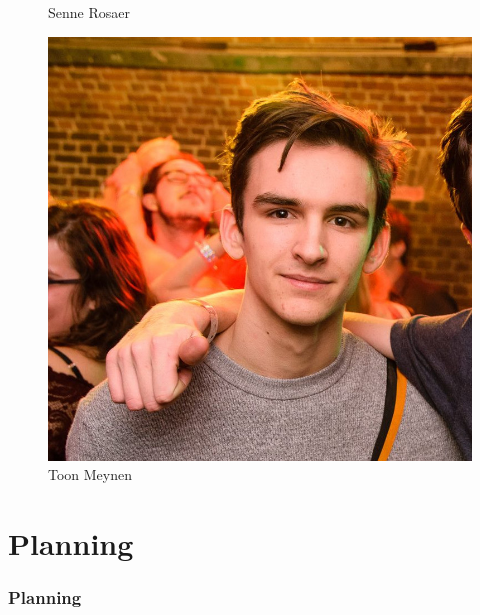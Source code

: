 \begin{frame}
\begin{figure}
\begin{minipage}{0.3\linewidth}
           	\footnotesize Senne Rosaer
       	\end{minipage}
        \begin{minipage}{0.3\linewidth}
           	\centering
			\includegraphics[width=\linewidth]{res/toon} \\
           	\footnotesize Toon Meynen
       	\end{minipage}
    \end{figure}

\end{frame}  
   
    
\section{Planning}
\addtocounter{minutes}{3}
\begin{frame}
	\frametitle{Planning}
    

\end{frame}

